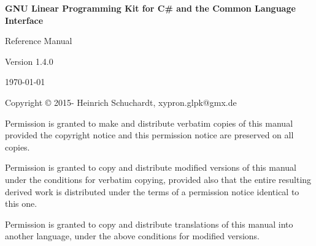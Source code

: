 \documentclass[a4paper,11pt]{report}
\newcommand{\glpkCliVersion}{1.4.0}
\begin{document}

\thispagestyle{empty}

\begin{center}

\vspace*{1in}

\begin{huge}
\sf\bfseries GNU Linear Programming Kit\linebreak
for C\# and the Common Language Interface
\end{huge}

\vspace{0.5in}

\begin{LARGE}
\sf Reference Manual
\end{LARGE}

\vspace{0.5in}

\begin{LARGE}
\sf Version \glpkCliVersion
\end{LARGE}

\vspace{0.5in}
\begin{Large}
\sf \today
\end{Large}
\end{center}

\newpage

\vspace*{1in}

\vfill

\medskip \noindent
Copyright \copyright{} 2015-{\the\year} Heinrich Schuchardt,
xypron.glpk@gmx.de

\medskip \noindent
Permission is granted to make and distribute verbatim copies of this
manual provided the copyright notice and this permission notice are
preserved on all copies.

\medskip \noindent
Permission is granted to copy and distribute modified versions of this
manual under the conditions for verbatim copying, provided also that the
entire resulting derived work is distributed under the terms of
a permission notice identical to this one.

\medskip \noindent
Permission is granted to copy and distribute translations of this manual
into another language, under the above conditions for modified versions.
\end{document}
